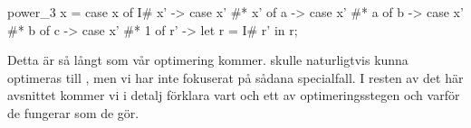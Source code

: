 \documentclass[../Optimise]{subfiles}
\begin{document}
\begin{codeEx}
power_3 x = case x of
    { I# x' -> case x' #* x' of
        { a -> case x' #* a of
            { b -> case x' #* b of
                { c -> case x' #* 1 of
                    { r' -> let r = I# r' in r}}}}};
\end{codeEx}

Detta är så långt som vår optimering kommer.  skulle naturligtvis
kunna optimeras till , men vi har inte fokuserat på sådana specialfall.
I resten av det här avsnittet kommer vi i detalj förklara vart och ett av optimeringsstegen 
och varför de fungerar som de gör.
\end{document}
